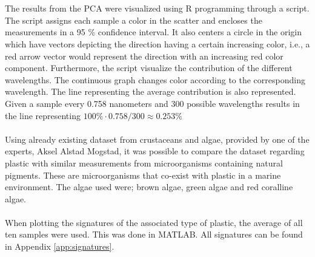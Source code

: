 \\\\
The results from the PCA were visualized using R programming through a script. The script assigns each sample a color in the scatter and encloses the measurements in a 95 \% confidence interval. It also centers a circle in the origin which have vectors depicting the direction having a certain increasing color, i.e., a red arrow vector would represent the direction with an increasing red color component. Furthermore, the script visualize the contribution of the different wavelengths. The continuous graph changes color according to the corresponding wavelength. The line representing the average contribution is also represented. Given a sample every 0.758 nanometers and 300 possible wavelengths results in the line representing $100\% \cdot 0.758/300 \approx 0.253 \% $
\\\\
Using already existing dataset from crustaceans and algae, provided by one of the experts, Aksel Alstad Mogstad, it was possible to compare the dataset regarding plastic with similar measurements from microorganisms containing natural pigments. These are microorganisms that co-exist with plastic in a marine environment. The algae used were; brown algae, green algae and red coralline algae.
\\\\
When plotting the signatures of the associated type of plastic, the average of all ten samples were used. This was done in MATLAB. All signatures can be found in Appendix \ref{app:signatures}.
















